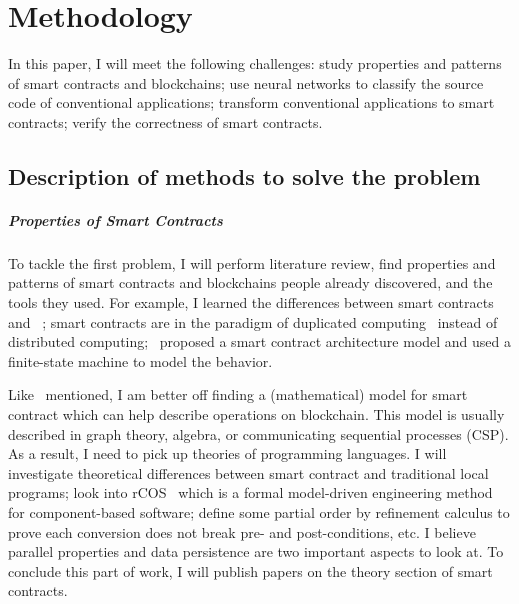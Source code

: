 \chapter{Methodology}

In this paper, I will meet the following challenges:
study properties and patterns of smart contracts and blockchains;
use neural networks to classify the source code of conventional applications;
transform conventional applications to smart contracts;
verify the correctness of smart contracts.


\section{Description of methods to solve the problem}

\paragraph*{Properties of Smart Contracts}
To tackle the first problem, I will perform literature review, find properties and patterns of smart contracts and blockchains people already discovered, and the tools they used.
For example, I learned the differences between smart contracts and {\dapp}~\cite{johnston2014general};
smart contracts are in the paradigm of duplicated computing~\cite{shae2018transform} instead of distributed computing;
\cite{yang2020implementation}~proposed a smart contract architecture model and used a finite-state machine to model the behavior.

Like~\cite{tolmach2021survey} mentioned, I am better off finding a (mathematical) model for smart contract which can help describe operations on blockchain. This model is usually described in graph theory, algebra, or communicating sequential processes (CSP).
As a result, I need to pick up theories of programming languages. I will investigate theoretical differences between smart contract and traditional local programs;
look into rCOS~\cite{ke2012rcos} which is a formal model-driven engineering method for component-based software;
define some partial order by refinement calculus to prove each conversion does not break pre- and post-conditions, etc.
I believe parallel properties and data persistence are two important aspects to look at.
To conclude this part of work, I will publish papers on the theory section of smart contracts.

